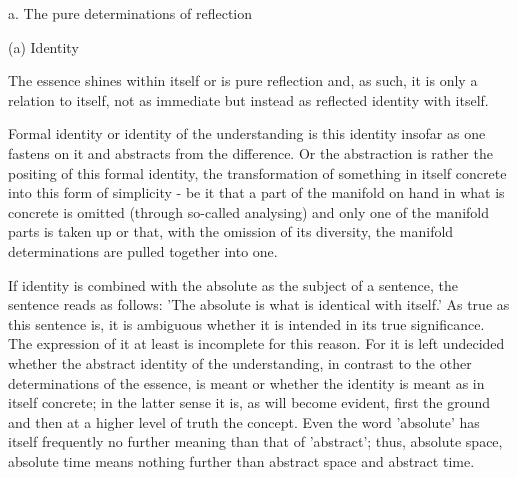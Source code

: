a. The pure determinations of reflection

(a) Identity

The essence shines within itself or is pure reflection and, as such,
it is only a relation to itself, not as immediate but instead as
reflected identity with itself.

    Formal identity or identity of the understanding is this identity
    insofar as one fastens on it and abstracts from the difference.
    Or the abstraction is rather the positing of this formal identity,
    the transformation of something in itself concrete into this form of
    simplicity - be it that a part of the manifold on hand in what is
    concrete is omitted (through so-called analysing) and only one of the
    manifold parts is taken up or that, with the omission of its diversity,
    the manifold determinations are pulled together into one.

    If identity is combined with the absolute as the subject of a sentence,
    the sentence reads as follows:
    'The absolute is what is identical with itself.'
    As true as this sentence is, it is ambiguous whether it is intended
    in its true significance.
    The expression of it at least is incomplete for this reason.
    For it is left undecided whether the abstract identity of the understanding,
    in contrast to the other determinations of the essence, is meant or
    whether the identity is meant as in itself concrete;
    in the latter sense it is, as will become evident,
    first the ground and then at a higher level of truth the concept.
    Even the word 'absolute' has itself frequently no further
    meaning than that of 'abstract';
    thus, absolute space, absolute time means nothing further than
    abstract space and abstract time.

